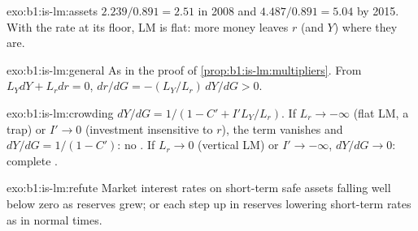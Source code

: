 \begin{solution}{exo:b1:is-lm:assets}
$2.239/0.891 = 2.51$ in 2008 and $4.487/0.891 = 5.04$ by 2015. With the rate at its
floor, LM is flat: more money leaves $r$ (and $Y$) where they are.
\end{solution}

\begin{solution}{exo:b1:is-lm:general}
As in the proof of \cref{prop:b1:is-lm:multipliers}. From $L_Y dY + L_r dr = 0$,
$dr/dG = -(L_Y/L_r)\,dY/dG > 0$.
\end{solution}

\begin{solution}{exo:b1:is-lm:crowding}
$dY/dG = 1/(1 - C' + I'L_Y/L_r)$. If $L_r \to -\infty$ (flat LM, a trap) or $I' \to 0$ (investment
insensitive to $r$), the term vanishes and $dY/dG = 1/(1 - C')$: no . If
$L_r \to 0$ (vertical LM) or $I' \to -\infty$, $dY/dG \to 0$: complete .
\end{solution}

\begin{solution}{exo:b1:is-lm:refute}
Market interest rates on short-term safe assets falling well below zero as
reserves grew; or each step up in reserves lowering short-term rates as in
normal times.
\end{solution}

